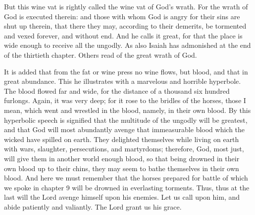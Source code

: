 But this wine vat is rightly called the wine vat of God’s wrath. For the wrath of God is executed therein: and those with whom God is angry for their sins are shut up therein, that there they may, according to their demerits, be tormented and vexed forever, and without end. And he calls it great, for that the place is wide enough to receive all the ungodly. As also Isaiah has admonished at the end of the thirtieth chapter. Others read of the great wrath of God.

It is added that from the fat or wine press no wine flows, but blood, and that in great abundance. This he illustrates with a marvelous and horrible hyperbole. The blood flowed far and wide, for the distance of a thousand six hundred furlongs. Again, it was very deep; for it rose to the bridles of the horses, those I mean, which went and wrestled in the blood, namely, in their own blood. By this hyperbolic speech is signified that the multitude of the ungodly will be greatest, and that God will most abundantly avenge that immeasurable blood which the wicked have spilled on earth. They delighted themselves while living on earth with wars, slaughter, persecutions, and martyrdoms; therefore, God, most just, will give them in another world enough blood, so that being drowned in their own blood up to their chins, they may seem to bathe themselves in their own blood. And here we must remember that the horses prepared for battle of which we spoke in chapter 9 will be drowned in everlasting torments. Thus, thus at the last will the Lord avenge himself upon his enemies. Let us call upon him, and abide patiently and valiantly. The Lord grant us his grace.
